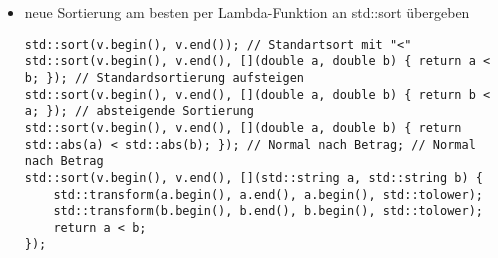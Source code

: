 \documentclass[a4paper]{scrartcl}
\begin{document}
\begin{itemize}
\begin{itemize}
\item neue Sortierung am besten per Lambda-Funktion an std::sort übergeben
\begin{verbatim}
std::sort(v.begin(), v.end()); // Standartsort mit "<"
std::sort(v.begin(), v.end(), [](double a, double b) { return a < b; }); // Standardsortierung aufsteigen
std::sort(v.begin(), v.end(), [](double a, double b) { return b < a; }); // absteigende Sortierung
std::sort(v.begin(), v.end(), [](double a, double b) { return std::abs(a) < std::abs(b); }); // Normal nach Betrag; // Normal nach Betrag
std::sort(v.begin(), v.end(), [](std::string a, std::string b) {
	std::transform(a.begin(), a.end(), a.begin(), std::tolower);
	std::transform(b.begin(), b.end(), b.begin(), std::tolower);
	return a < b;
});
\end{verbatim}
\end{itemize}
\end{itemize}
\end{document}
